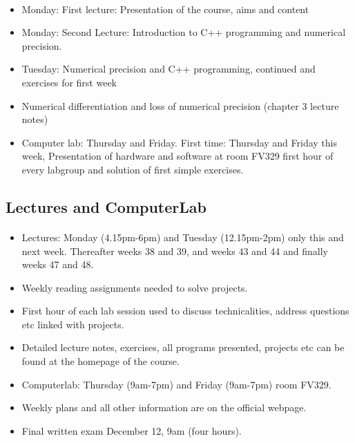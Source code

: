 \documentclass[%
twoside,                 %
final,                   %
10pt]{article}
\begin{document}
\paragraph{}
\begin{itemize}
  \item Monday: First lecture: Presentation of the course, aims and content

  \item Monday: Second Lecture: Introduction to C++ programming and numerical precision.

  \item Tuesday: Numerical precision and C++ programming, continued and exercises for first week

  \item Numerical differentiation and loss of numerical precision (chapter 3 lecture notes)

  \item Computer lab: Thursday and Friday. First time: Thursday and Friday this week, Presentation of hardware and software at room FV329 first hour of every labgroup and solution of first simple exercises.
\end{itemize}

\noindent



\subsection*{Lectures and ComputerLab}


\paragraph{}
\begin{itemize}
  \item Lectures: Monday (4.15pm-6pm) and Tuesday (12.15pm-2pm) only this and next week. Thereafter weeks 38 and 39, and weeks 43 and 44 and finally weeks 47 and 48.

  \item Weekly reading assignments needed to solve projects.

  \item First hour of each lab session used to discuss technicalities, address questions etc linked with projects.

  \item Detailed lecture notes, exercises, all programs presented, projects etc can be found at the homepage of the course.

  \item Computerlab: Thursday (9am-7pm) and Friday (9am-7pm) room FV329.

  \item Weekly plans and all other information are on the official webpage.

  \item Final written exam December 12, 9am (four hours).
\end{itemize}
\end{document}

